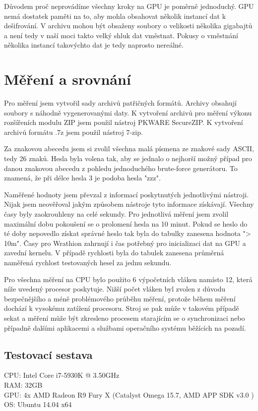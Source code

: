 Důvodem proč neprovádíme všechny kroky na GPU je poměrně jednoduchý. GPU nemá dostatek paměti na
to, aby mohla obsahovat několik instancí dat k dešifrování. V archivu mohou být obsaženy soubory o
velikosti několika gigabajtů a není tedy v naší moci takto velký shluk dat vměstnat. Pokusy o
vměstnání několika instancí takovýchto dat je tedy naprosto nereálné. 

\chapter{Měření a srovnání}
\label{ch:mereni_a_srovnani}
Pro měření jsem vytvořil sady archivů patřičných formátů. Archivy obsahují soubory s náhodně
vygenerovanými daty. K vytvoření archivů pro měření výkonu rozšířeních modulu ZIP jsem použil
nástroj PKWARE SecureZIP. K vytvoření archivů formátu .7z jsem použil nástroj 7-zip.

Za znakovou abecedu jsem si zvolil všechna malá písmena ze znakové sady ASCII, tedy 26 znaků.
Hesla byla volena tak, aby se jednalo o nejhorší možný případ pro danou znakovou abecedu z pohledu
jednoduchého brute-force generátoru. To znamená, že při délce hesla 3 je podoba hesla "zzz".

Naměřené hodnoty jsem převzal z informací poskytnutých jednotlivými nástroji. Nijak jsem
neověřoval jakým způsobem nástroje tyto informace získávají. Všechny časy byly zaokrouhleny na
celé sekundy. Pro jednotlivá měření jsem zvolil maximální dobu pokoušení se o prolomení hesla na
10 minut. Pokud se heslo do té doby nepovedlo získat správné heslo tak byla do tabulky zanesena
hodnota "> 10m". Časy pro Wrathion zahrnují i čas potřebný pro inicializaci dat na GPU a zavední
kernelu. V případě rychlosti byla do tabulek zanesena průměrná naměřená rychlost testovaných
hesel za jednu sekundu.

Pro všechna měření na CPU bylo použito 6 výpočetních vláken namísto 12, která níže uvedený
procesor poskytuje. Nižší počet vláken byl zvolen z důvodu bezpečnějšího a méně problémového
průběhu měření, protože během měření dochází k vysokému zatížení procesoru. Stroj se pak může v
takovém případě sekat a měření může být zkresleno procesem starajícím se o synchronizaci nebo
případně dalšími aplikacemi a službami operačního systému běžících na pozadí.

\section{Testovací sestava}
CPU: Intel Core i7-5930K @ 3.50GHz\\
RAM: 32GB\\
GPU: 4x AMD Radeon R9 Fury X (Catalyst Omega 15.7, AMD APP SDK v3.0 )\\
OS: Ubuntu 14.04 x64
